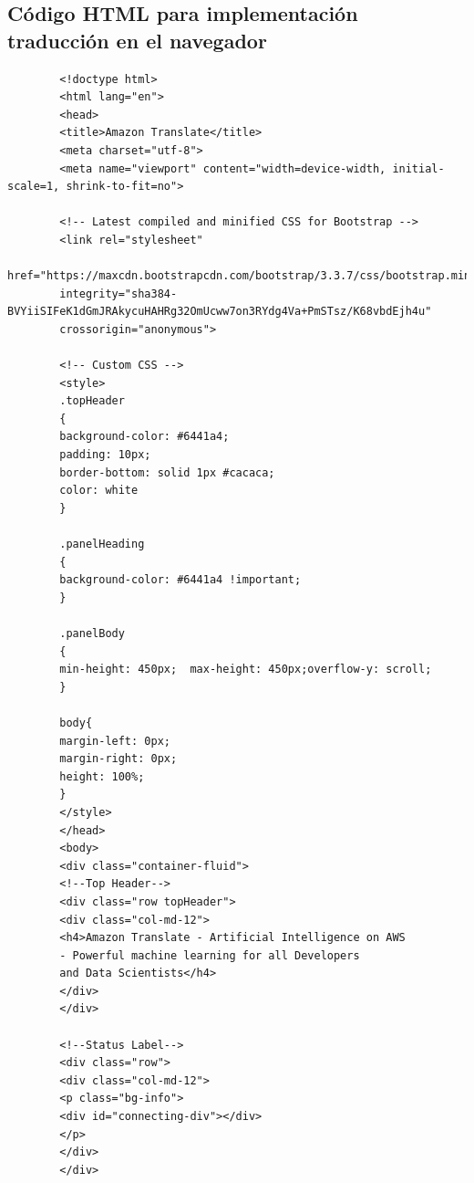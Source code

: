 \documentclass[english,runningheads,a4paper]{llncs}[2018/03/10]
\begin{document}
    \subsection{Código HTML para implementación traducción en el navegador}
        \begin{verbatim}
        <!doctype html>
        <html lang="en">
        <head>
        <title>Amazon Translate</title>
        <meta charset="utf-8">
        <meta name="viewport" content="width=device-width, initial-scale=1, shrink-to-fit=no">
        
        <!-- Latest compiled and minified CSS for Bootstrap -->
        <link rel="stylesheet"
        href="https://maxcdn.bootstrapcdn.com/bootstrap/3.3.7/css/bootstrap.min.css"
        integrity="sha384-BVYiiSIFeK1dGmJRAkycuHAHRg32OmUcww7on3RYdg4Va+PmSTsz/K68vbdEjh4u" 
        crossorigin="anonymous">
        
        <!-- Custom CSS -->
        <style>
        .topHeader
        {
        background-color: #6441a4;
        padding: 10px;
        border-bottom: solid 1px #cacaca;
        color: white
        }
        
        .panelHeading
        {
        background-color: #6441a4 !important;
        }
        
        .panelBody
        {
        min-height: 450px;  max-height: 450px;overflow-y: scroll;
        }
        
        body{
        margin-left: 0px;
        margin-right: 0px;
        height: 100%;
        }
        </style>
        </head>
        <body>
        <div class="container-fluid">
        <!--Top Header-->
        <div class="row topHeader">
        <div class="col-md-12">
        <h4>Amazon Translate - Artificial Intelligence on AWS
        - Powerful machine learning for all Developers 
        and Data Scientists</h4>
        </div>
        </div>
        
        <!--Status Label-->
        <div class="row">
        <div class="col-md-12">
        <p class="bg-info">
        <div id="connecting-div"></div>
        </p>
        </div>
        </div>
        

\end{verbatim}
\end{document}
